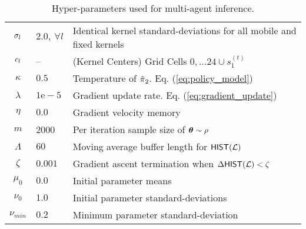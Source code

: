 \begin{table}[H]
        \centering
        \begin{tabular}{c|l l}
                $\sigma_{l}$ & $2.0,\ \forall l$ & Identical kernel standard-deviations for all mobile and
                                                               fixed kernels\\
                $c_{l}$ & -- & (Kernel Centers) Grid Cells $0,\ldots 24 \cup s_1^{(t)}$\\
                $\kappa$ & $0.5$ & Temperature of $\hat{\pi_{}}_2$. Eq. (\ref{eq:policy_model}) \\
                $\lambda$ & $1\mathrm{e}\!-\!5$ & Gradient update rate. Eq. (\ref{eq:gradient_update}) \\
                $\eta$ & $0.0$ & Gradient velocity memory\\
                $m$ & 2000 & Per iteration sample size of $\boldsymbol{\mathbb{\theta}}\sim \rho$\\
                $\Lambda$ & $60$ & Moving average buffer length for $\mathsf{HIST}(\mathcal{L})$ \\
                $\zeta$ & $0.001$ & Gradient ascent termination when $\Delta\mathsf{HIST}(\mathcal{L}) < \zeta$\\
                $\mu_{0}$ & $0.0$ & Initial parameter means\\
                $\nu_{0}$ & $1.0$ & Initial parameter standard-deviations\\
                $\nu_{min}$ & $0.2$ & Minimum parameter standard-deviation\\
        \end{tabular}
        \caption{Hyper-parameters used for multi-agent inference.}
        \label{table:multi_agent_hyper_params}
\end{table}

    \begin{figure}[htb]
        \begin{center}
        \end{center}
\end{figure}


